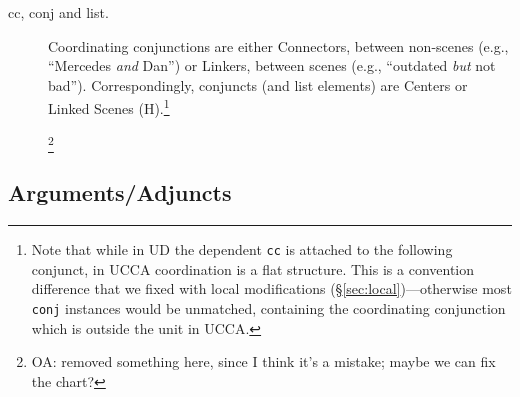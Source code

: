 \documentclass[11pt,a4paper]{article}
\newcommand{\oa}[1]{\footnote{\color{red}OA: #1}}
\begin{document}
\begin{description}
    \item[cc, conj and list.]
    Coordinating conjunctions are either Connectors, between non-scenes
    (e.g., ``Mercedes \textit{and} Dan'')
    or Linkers, between scenes
    (e.g., ``outdated \textit{but} not bad'').
    Correspondingly, conjuncts (and list elements)
    are Centers or Linked Scenes (H).\footnote{Note
    that while in UD the dependent \texttt{cc} is attached to the following conjunct,
    in UCCA coordination is a flat structure.
    This is a convention difference that we fixed with local modifications
    (\S\ref{sec:local})---otherwise most \texttt{conj} instances would be unmatched,
    containing the coordinating conjunction which is outside the unit in UCCA.}

    \oa{removed something here, since I think it's a mistake; maybe we can fix the chart?}
\end{description}

\subsection{Arguments/Adjuncts}\label{sec:arguments}
\end{document}

